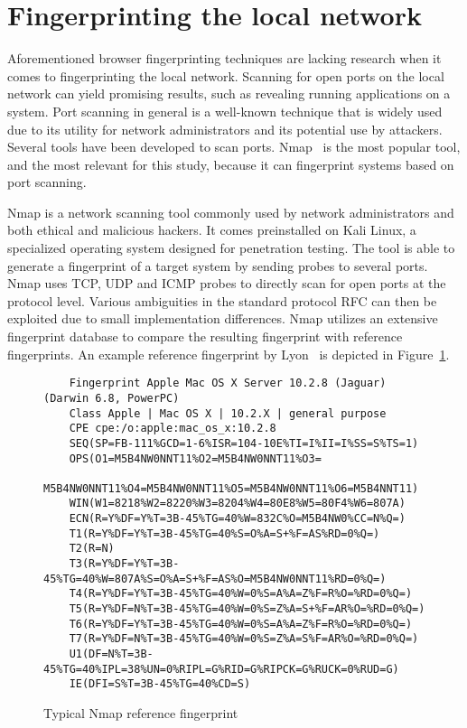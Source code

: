 \section{Fingerprinting the local network}
Aforementioned browser fingerprinting techniques are lacking research when it comes to fingerprinting the local network. Scanning for open ports on the local network can yield promising results, such as revealing running applications on a system.
Port scanning in general is a well-known technique that is widely used due to its utility for network administrators and its potential use by attackers.
Several tools have been developed to scan ports. Nmap~ is the most popular tool, and the most relevant for this study, because it can fingerprint systems based on port scanning. 

Nmap is a network scanning tool commonly used by network administrators and both ethical and malicious hackers. It comes preinstalled on Kali Linux, a specialized operating system designed for penetration testing. The tool is able to generate a fingerprint of a target system by sending probes to several ports. Nmap uses TCP, UDP and ICMP probes to directly scan for open ports at the protocol level. Various ambiguities in the standard protocol RFC can
then be exploited due to small implementation differences.
Nmap utilizes an extensive fingerprint database to compare the resulting fingerprint with reference fingerprints. 
An example reference fingerprint by Lyon~ is depicted in Figure~\ref{fig:nmap-fingerprint}. 

\begin{figure}[htbp]
    \begin{verbatim}
    Fingerprint Apple Mac OS X Server 10.2.8 (Jaguar) (Darwin 6.8, PowerPC)
    Class Apple | Mac OS X | 10.2.X | general purpose
    CPE cpe:/o:apple:mac_os_x:10.2.8
    SEQ(SP=FB-111%GCD=1-6%ISR=104-10E%TI=I%II=I%SS=S%TS=1)
    OPS(O1=M5B4NW0NNT11%O2=M5B4NW0NNT11%O3=
    M5B4NW0NNT11%O4=M5B4NW0NNT11%O5=M5B4NW0NNT11%O6=M5B4NNT11)
    WIN(W1=8218%W2=8220%W3=8204%W4=80E8%W5=80F4%W6=807A)
    ECN(R=Y%DF=Y%T=3B-45%TG=40%W=832C%O=M5B4NW0%CC=N%Q=)
    T1(R=Y%DF=Y%T=3B-45%TG=40%S=O%A=S+%F=AS%RD=0%Q=)
    T2(R=N)
    T3(R=Y%DF=Y%T=3B-45%TG=40%W=807A%S=O%A=S+%F=AS%O=M5B4NW0NNT11%RD=0%Q=)
    T4(R=Y%DF=Y%T=3B-45%TG=40%W=0%S=A%A=Z%F=R%O=%RD=0%Q=)
    T5(R=Y%DF=N%T=3B-45%TG=40%W=0%S=Z%A=S+%F=AR%O=%RD=0%Q=)
    T6(R=Y%DF=Y%T=3B-45%TG=40%W=0%S=A%A=Z%F=R%O=%RD=0%Q=)
    T7(R=Y%DF=N%T=3B-45%TG=40%W=0%S=Z%A=S%F=AR%O=%RD=0%Q=)
    U1(DF=N%T=3B-45%TG=40%IPL=38%UN=0%RIPL=G%RID=G%RIPCK=G%RUCK=0%RUD=G)
    IE(DFI=S%T=3B-45%TG=40%CD=S)
    \end{verbatim}
    \caption{Typical Nmap reference fingerprint}
    \label{fig:nmap-fingerprint}
\end{figure}

